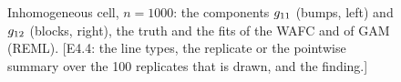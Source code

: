 \begin{figure}[t]
\color{colR1}
\centering
{}
\caption{Inhomogeneous cell, $n = 1000$: the components $g_{11}$
(bumps, left) and $g_{12}$ (blocks, right), the truth and the fits of
the WAFC and of GAM (REML). [E4.4: the line types, the replicate or the
pointwise summary over the 100 replicates that is drawn, and the finding.]}
\label{fig:sim-components}
\end{figure}
